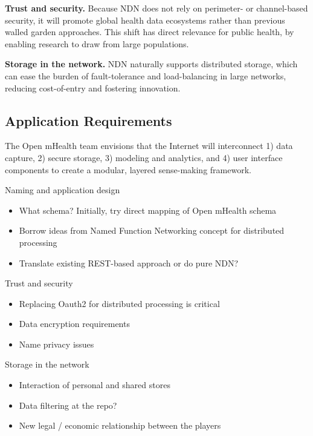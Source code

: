 {\bf Trust and security.} Because NDN does not rely on perimeter- or channel-based security, it will promote global health data ecosystems rather than previous walled garden approaches.   This shift has direct relevance for public health, by enabling research to draw from large populations. 

{\bf Storage in the network.} NDN naturally supports distributed storage, which can ease the burden of fault-tolerance and load-balancing in large networks, reducing cost-of-entry and fostering innovation. 


\subsection{Application Requirements}
The Open mHealth team envisions that the Internet will interconnect 1)
data capture, 2) secure storage, 3) modeling and analytics, and 4) user
interface components to create a modular, layered sense-making framework.  

Naming and application design
\begin{itemize}
\item What schema? Initially, try direct mapping of Open mHealth schema
\item Borrow ideas from Named Function Networking concept for distributed processing
\item Translate existing REST-based approach or do pure NDN? 
\end{itemize}

Trust and security
\begin{itemize}
\item Replacing Oauth2 for distributed processing is critical
\item Data encryption requirements
\item Name privacy issues
\end{itemize}

Storage in the network
\begin{itemize}
\item Interaction of personal and shared stores
\item Data filtering at the repo?
\item New legal / economic relationship between the players
\end{itemize}